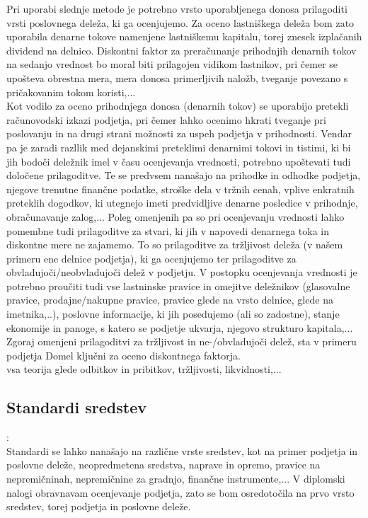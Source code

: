 \documentclass[12pt,a4paper]{amsart}
\theoremstyle{definition} %
\theoremstyle{plain} %
\begin{document}
Pri uporabi slednje metode je potrebno vrsto uporabljenega donosa prilagoditi vrsti poslovnega deleža, ki ga ocenjujemo. Za oceno lastniškega deleža bom zato uporabila denarne tokove namenjene lastniškemu kapitalu, torej znesek izplačanih dividend na delnico. Diskontni faktor za preračunanje prihodnjih denarnih tokov na sedanjo vrednost bo moral biti prilagojen vidikom lastnikov, pri čemer se upošteva obrestna mera, mera donosa primerljivih naložb, tveganje povezano s pričakovanim tokom koristi,...\\
Kot vodilo za oceno prihodnjega donosa (denarnih tokov) se uporabijo pretekli računovodski izkazi podjetja, pri čemer lahko ocenimo hkrati tveganje pri poslovanju in na drugi strani možnosti za uspeh podjetja v prihodnosti. Vendar pa je zaradi razllik med dejanskimi preteklimi denarnimi tokovi in tistimi, ki bi jih bodoči deležnik imel v času ocenjevanja vrednosti, potrebno upoštevati tudi določene prilagoditve. Te se predvsem nanašajo na prihodke in odhodke podjetja, njegove trenutne finančne podatke, stroške dela v tržnih cenah, vplive enkratnih preteklih dogodkov, ki utegnejo imeti predvidljive denarne posledice v prihodnje, obračunavanje zalog,... Poleg omenjenih pa so pri ocenjevanju vrednosti lahko pomembne tudi prilagoditve za stvari, ki jih v napovedi denarnega toka in diskontne mere ne zajamemo. To so prilagoditve za tržljivost deleža (v našem primeru ene delnice podjetja), ki ga ocenjujemo ter prilagoditve za obvladujoči/neobvladujoči delež v podjetju. V postopku ocenjevanja vrednosti je potrebno proučiti tudi vse lastninske pravice in omejitve deležnikov (glasovalne pravice, prodajne/nakupne pravice, pravice glede na vrsto delnice, glede na imetnika,..), poslovne informacije, ki jih posedujemo (ali so zadostne), stanje ekonomije in panoge, s katero se podjetje ukvarja, njegovo strukturo kapitala,... \\
Zgoraj omenjeni prilagoditvi za tržljivost in ne-/obvladujoči delež, sta v primeru podjetja Domel ključni za oceno diskontnega faktorja.\\

vsa teorija glede odbitkov in pribitkov, tržljivosti, likvidnosti,...


\subsection*{Standardi sredstev}:\\
Standardi se lahko nanašajo na različne vrste sredstev, kot na primer podjetja in poslovne deleže, neopredmetena sredstva, naprave in opremo, pravice na nepremičninah, nepremičnine za gradnjo, finančne instrumente,... V diplomski nalogi obravnavam ocenjevanje podjetja, zato se bom osredotočila na prvo vrsto sredstev, torej podjetja in poslovne deleže.
\end{document}
